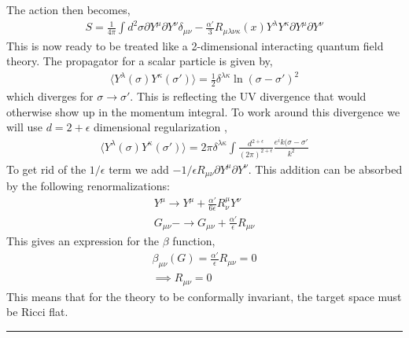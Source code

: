 \documentclass{article}
\begin{document}
The action then becomes,
\begin{align}
    S = \frac{1}{4\pi} \int d^2\sigma \partial Y^\mu \partial Y^\nu \delta_{\mu\nu}-\frac{\alpha'}{3}R_{\mu\lambda\nu\kappa}(x)Y^\lambda Y^\kappa\partial Y^\mu \partial Y^\nu
\end{align}
This is now ready to be treated like a 2-dimensional interacting quantum field theory. The propagator for a scalar particle is given by,
\begin{align}
    \langle{Y^\lambda(\sigma)Y^\kappa(\sigma')}\rangle=\frac{1}{2}\delta^{\lambda\kappa}\ln(\sigma-\sigma')^2
\end{align}
which diverges for $\sigma\rightarrow\sigma'$. This is reflecting the UV divergence that would otherwise show up in the momentum integral. To work around this divergence we will use $d=2+\epsilon$ dimensional regularization \cite{friedan paper here},
\begin{align}
\langle{Y^\lambda(\sigma)Y^\kappa(\sigma')}\rangle=2\pi\delta^{\lambda\kappa}\int \frac{d^{2+\epsilon}}{(2\pi)^{2+\epsilon}}\frac{e^ik(\sigma-\sigma'}{k^2}
\end{align}
To get rid of the $1/\epsilon$ term we add $-1/\epsilon R_{\mu\nu}\partial Y^\mu \partial Y^\nu$. This addition can be absorbed by the following renormalizations:
\begin{align}
    Y^\mu\rightarrow Y^\mu+\frac{\alpha'}{6\epsilon}R^\mu_\nu Y^\nu\\
    G_{\mu\nu}-\rightarrow G_{\mu\nu}+\frac{\alpha'}{\epsilon}R_{\mu\nu}
\end{align}
This gives an expression for the $\beta$ function,
\begin{align}
    \beta_{\mu\nu}(G) = \frac{\alpha'}{\epsilon}R_{\mu\nu}=0\\
    \implies R_{\mu\nu}=0
\end{align}
    This means that for the theory to be conformally invariant, the target space must be Ricci flat.
    \begin{center}
\end{center}
\hrule\vspace{0.3cm}
\end{document}
